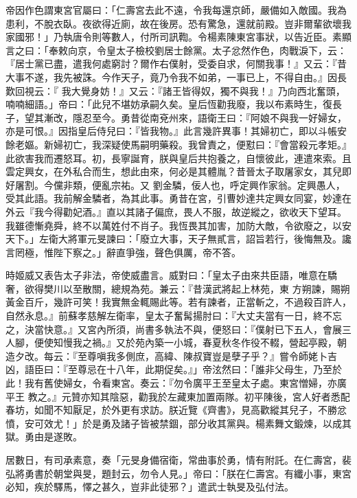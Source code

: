 \begin{pinyinscope}
 帝因作色謂東宮官屬曰：「仁壽宮去此不遠，令我每還京師，嚴備如入敵國。我為患利，不脫衣臥。夜欲得近廁，故在後房。恐有驚急，還就前殿。豈非爾輩欲壞我家國邪！」乃執唐令則等數人，付所司訊鞫。令楊素陳東宮事狀，以告近臣。素顯言之曰：「奉敕向京，令皇太子檢校劉居士餘黨。太子忿然作色，肉戰淚下，云：『居士黨已盡，遣我何處窮討？爾作右僕射，受委自求，何關我事！』又云：『昔大事不遂，我先被誅。今作天子，竟乃令我不如弟，一事已上，不得自由。』因長歎回視云：『
 我大覺身妨！』又云：『諸王皆得奴，獨不與我！』乃向西北奮頭，喃喃細語。」帝曰：「此兒不堪妨承嗣久矣。皇后恆勸我廢，我以布素時生，復長子，望其漸改，隱忍至今。勇昔從南兗州來，語衛王曰：『阿娘不與我一好婦女，亦是可恨。』因指皇后侍兒曰：『皆我物。』此言幾許異事！其婦初亡，即以斗帳安餘老嫗。新婦初亡，我深疑使馬嗣明藥殺。我曾責之，便懟曰：『會當殺元孝矩。』此欲害我而遷怒耳。初，長寧誕育，朕與皇后共抱養之，自懷彼此，連遣來索。且雲定興女，在外私合而生，想此由來，何必是其體胤？昔晉太子取屠家女，其兒即好屠割。今儻非類，便亂宗祐。又
 劉金驎，佞人也，呼定興作家翁。定興愚人，受其此語。我前解金驎者，為其此事。勇昔在宮，引曹妙達共定興女同宴，妙達在外云『我今得勸妃酒。』直以其諸子偏庶，畏人不服，故逆縱之，欲收天下望耳。我雖德慚堯舜，終不以萬姓付不肖子。我恆畏其加害，加防大敵，令欲廢之，以安天下。」左衛大將軍元旻諫曰：「廢立大事，天子無貳言，詔旨若行，後悔無及。讒言罔極，惟陛下察之。」辭直爭強，聲色俱厲，帝不答。



 時姬威又表告太子非法，帝使威盡言。威對曰：「皇太子由來共臣語，唯意在驕奢，欲得樊川以至散關，總規為苑。兼云：『昔漢武將起上林苑，東
 方朔諫，賜朔黃金百斤，幾許可笑！我實無金輒賜此等。若有諫者，正當斬之，不過殺百許人，自然永息。』前蘇孝慈解左衛率，皇太子奮髯揚肘曰：『大丈夫當有一日，終不忘之，決當快意。』又宮內所須，尚書多執法不與，便怒曰：『僕射已下五人，會展三人腳，便使知慢我之禍。』又於苑內築一小城，春夏秋冬作役不輟，營起亭殿，朝造夕改。每云：『至尊嗔我多側庶，高緯、陳叔寶豈是孽子乎？』嘗令師姥卜吉凶，語臣曰：『至尊忌在十八年，此期促矣。』」帝泫然曰：「誰非父母生，乃至於此！我有舊使婦女，令看東宮。奏云：『勿令廣平王至皇太子處。東宮憎婦，亦廣平王
 教之。』元贊亦知其陰惡，勸我於左藏東加置兩隊。初平陳後，宮人好者悉配春坊，如聞不知厭足，於外更有求訪。朕近覽《齊書》，見高歡縱其兒子，不勝忿憤，安可效尤！」於是勇及諸子皆被禁錮，部分收其黨與。楊素舞文鍛煉，以成其獄。勇由是遂敗。



 居數日，有司承素意，奏「元旻身備宿衛，常曲事於勇，情有附託。在仁壽宮，裴弘將勇書於朝堂與旻，題封云，勿令人見。」帝曰：「朕在仁壽宮。有纖小事，東宮必知，疾於驛馬，懌之甚久，豈非此徒邪？」遣武士執旻及弘付法。




\end{pinyinscope}
